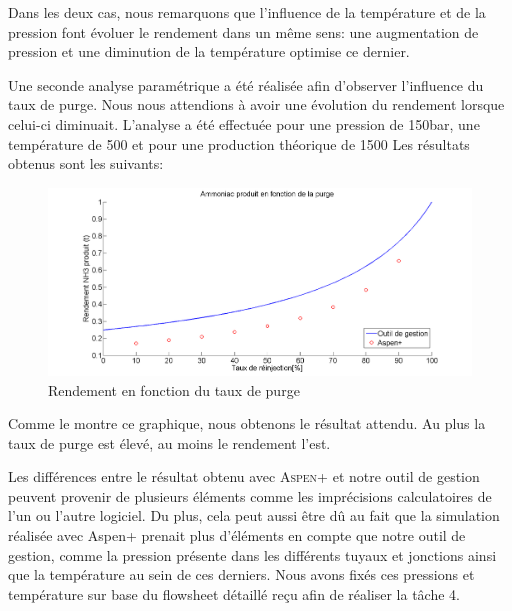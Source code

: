 Dans les deux cas, nous remarquons que l'influence de la température et de la pression font évoluer le rendement dans un même sens: une augmentation de pression et une diminution de la température optimise ce dernier.

Une seconde analyse paramétrique a été réalisée afin d'observer l'influence du taux de purge. Nous nous attendions à avoir une évolution du rendement lorsque celui-ci diminuait. L'analyse a été effectuée pour une pression de \unit{150}{bar}, une température de \unit{500}{\celsius} et pour une production théorique de \unit{1500}{\tonne} Les résultats obtenus sont les suivants:

\begin{figure}[ht!]
 \centering
 \includegraphics[scale=0.4]{GrapheCompPu.png}
 \caption{Rendement en fonction du taux de purge}
 \label{scheme}
\end{figure}

Comme le montre ce graphique, nous obtenons le résultat attendu. Au plus la taux de purge est élevé, au moins le rendement l'est.

Les différences entre le résultat obtenu avec \textsc{Aspen+} et notre outil de gestion peuvent provenir de plusieurs éléments comme les imprécisions calculatoires de l'un ou l'autre logiciel. Du plus, cela peut aussi être dû au fait que la simulation réalisée avec Aspen+ prenait plus d'éléments en compte que notre outil de gestion, comme la pression présente dans les différents tuyaux et jonctions ainsi que la température au sein de ces derniers. Nous avons fixés ces pressions et température sur base du flowsheet détaillé reçu afin de réaliser la tâche 4. 